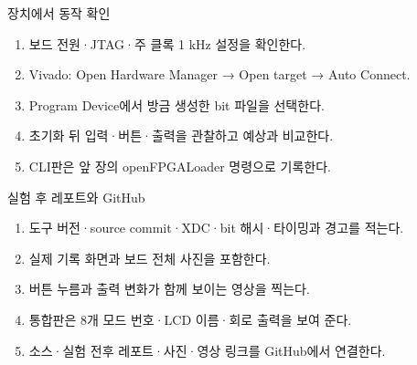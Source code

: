 \begin{frame}{장치에서 동작 확인}
\small
\begin{enumerate}
\item 보드 전원·JTAG·주 클록 1 kHz 설정을 확인한다.
\item Vivado: Open Hardware Manager → Open target → Auto Connect.
\item Program Device에서 방금 생성한 bit 파일을 선택한다.
\item 초기화 뒤 입력·버튼·출력을 관찰하고 예상과 비교한다.
\item CLI판은 앞 장의 openFPGALoader 명령으로 기록한다.
\end{enumerate}
\end{frame}

\begin{frame}{실험 후 레포트와 GitHub}
\small
\begin{enumerate}
\item 도구 버전·source commit·XDC·bit 해시·타이밍과 경고를 적는다.
\item 실제 기록 화면과 보드 전체 사진을 포함한다.
\item 버튼 누름과 출력 변화가 함께 보이는 영상을 찍는다.
\item 통합판은 8개 모드 번호·LCD 이름·회로 출력을 보여 준다.
\item 소스·실험 전후 레포트·사진·영상 링크를 GitHub에서 연결한다.
\end{enumerate}
\end{frame}

